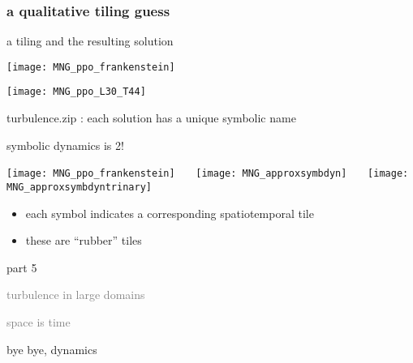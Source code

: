 \begin{frame}%
  \frametitle{a qualitative tiling guess}
  \begin{block} {a tiling and the resulting solution}
  \qquad
\begin{minipage}[height=.80\textheight]{.25\textheight}
\centering             %
  \qquad\qquad
\texttt{[image: MNG\_ppo\_frankenstein]}
\end{minipage} \quad\quad
\begin{minipage}[height=.80\textheight]{.25\textheight}
\texttt{[image: MNG\_ppo\_L30\_T44]}
\end{minipage} \qquad\qquad
  \end{block}
\end{frame}

\begin{frame}{turbulence.zip : each solution has a unique symbolic name}
  \begin{block} {symbolic dynamics is 2\dmn!}
  \begin{center}
  \texttt{[image: MNG\_ppo\_frankenstein]}
~~~\texttt{[image: MNG\_approxsymbdyn]}
~~~\texttt{[image: MNG\_approxsymbdyntrinary]}
  \end{center}
  \end{block}
\begin{itemize}
 \item each symbol indicates a corresponding spatiotemporal tile
 \item these are ``rubber'' tiles
\end{itemize}
\end{frame}

\begin{frame}{part 5}
\begin{enumerate}
              \item
    \textcolor{gray}{\small
turbulence in large domains
              \item
space is time
    }
              \item
    {\Large
bye bye, dynamics
    }
            \end{enumerate}
\end{frame}

